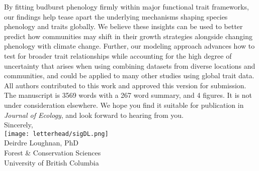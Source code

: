 \documentclass[11pt,a4paper]{article}
\begin{document}
\noindent By fitting budburst phenology firmly within major functional trait frameworks, our findings help tease apart the underlying mechanisms shaping species phenology and traits globally. We believe these insights can be used to better predict how communities may shift in their growth strategies alongside changing phenology with climate change. Further, our modeling approach advances how to test for broader trait relationships while accounting for the high degree of uncertainty that arises when using combining datasets from diverse locations and communities, and could be applied to many other studies using global trait data.
\vspace{1.5ex}\\
\noindent All authors contributed to this work and approved this version for submission. The manuscript is 3569 words with a 267 word summary, and 4 figures. It is not under consideration elsewhere. We hope you find it suitable for publication in \emph{Journal of Ecology}, and look forward to hearing from you. 
\vspace{1.5ex}\\
\noindent Sincerely, \\
\texttt{[image: letterhead/sigDL.png]} \\
\noindent Deirdre Loughnan, PhD\\
\noindent Forest \& Conservation Sciences\\
\noindent University of British Columbia

\newpage
\end{document}
